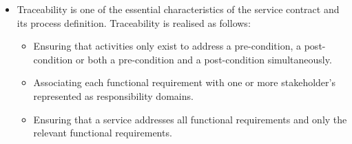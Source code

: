 \begin{itemize}
\begin{itemize}
\begin{itemize}
					\item Traceability is one of the essential characteristics of the service contract and its process definition. Traceability is realised as follows:
						\begin{itemize}
							\item Ensuring that activities only exist to address a pre-condition, a post-condition or both a pre-condition and a post-condition simultaneously.
							\item Associating each functional requirement with one or more stakeholder's represented as responsibility domains.
							\item Ensuring that a service addresses all functional requirements and only the relevant functional requirements.
						\end{itemize}
			\end{itemize}
		\end{itemize}
		

\end{itemize}

